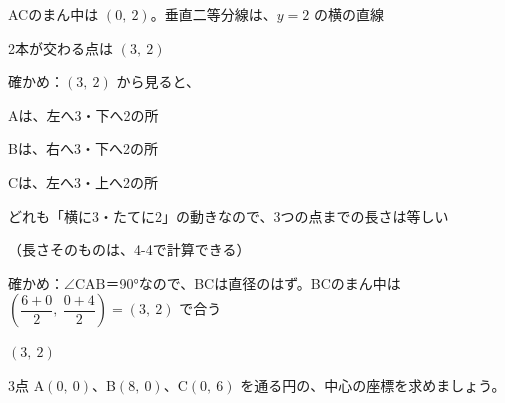 \begin{reidai}
\hspace*{2.6\zw}ACのまん中は $(0,\ 2)$。垂直二等分線は、$y=2$ の横の直線\par
\hspace*{2.6\zw}2本が交わる点は $(3,\ 2)$\par
\hspace*{2.6\zw}確かめ：$(3,\ 2)$ から見ると、\par
\hspace*{4.3\zw}Aは、左へ3・下へ2の所\par
\hspace*{4.3\zw}Bは、右へ3・下へ2の所\par
\hspace*{4.3\zw}Cは、左へ3・上へ2の所\par
\hspace*{4.3\zw}どれも「横に3・たてに2」の動きなので、3つの点までの長さは等しい\par
\hspace*{4.3\zw}（長さそのものは、4-4で計算できる）\par
\hspace*{2.6\zw}確かめ：$\angle\mathrm{CAB}$＝90°なので、BCは直径のはず。BCのまん中は $\left(\dfrac{6+0}{2},\ \dfrac{0+4}{2}\right)=(3,\ 2)$ で合う\par
\kotae $(3,\ 2)$
\end{reidai}

\begin{jibun}
3点 A$(0,\ 0)$、B$(8,\ 0)$、C$(0,\ 6)$ を通る円の、中心の座標を求めましょう。
\end{jibun}

